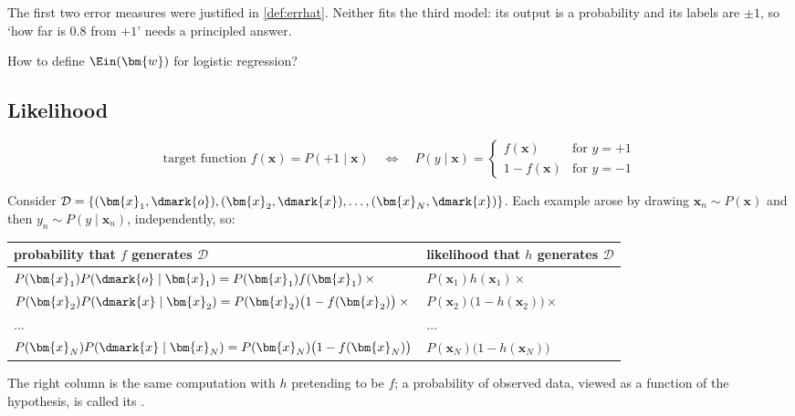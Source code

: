 The first two error measures were justified in \autoref{def:errhat}. Neither
fits the third model: its output is a probability and its labels are
\(\pm 1\), so `how far is \(0.8\) from \(+1\)' needs a principled answer.

\begin{question}
    How to define \(\Ein(\bm{w})\) for logistic regression?
\end{question}

\subsection{Likelihood}

\[
    \text{target function } f(\bm{x}) = P(+1 \mid \bm{x})
    \quad \Longleftrightarrow \quad
    P(y \mid \bm{x}) = \begin{cases}
        f(\bm{x}) & \text{for } y = +1\\
        1 - f(\bm{x}) & \text{for } y = -1
    \end{cases}
\]

Consider \(\mathcal{D} = \left\{ (\bm{x}_1, \dmark{o}), (\bm{x}_2, \dmark{x}),
\dots , (\bm{x}_N, \dmark{x}) \right\}\). Each example arose by drawing
\(\bm{x}_n \sim P(\bm{x})\) and then \(y_n \sim P(y \mid \bm{x}_n)\),
independently, so:

\begin{center}
    \solidrules
    \begin{tabular}{@{}l|l@{}}
        \toprule
        \textbf{probability that \(f\) generates \(\mathcal{D}\)}
        & \textbf{likelihood that \(h\) generates \(\mathcal{D}\)}\\
        \midrule
        \(P(\bm{x}_1) P(\dmark{o} \mid \bm{x}_1) = P(\bm{x}_1) f(\bm{x}_1)
        \times{}\)
        & \(P(\bm{x}_1) h(\bm{x}_1) \times{}\)\\
        \(P(\bm{x}_2) P(\dmark{x} \mid \bm{x}_2) = P(\bm{x}_2) \bigl( 1 -
        f(\bm{x}_2) \bigr) \times{}\)
        & \(P(\bm{x}_2) \bigl( 1 - h(\bm{x}_2) \bigr) \times{}\)\\
        \(\dots\) & \(\dots\)\\
        \(P(\bm{x}_N) P(\dmark{x} \mid \bm{x}_N) = P(\bm{x}_N) \bigl( 1 -
        f(\bm{x}_N) \bigr)\)
        &\(P(\bm{x}_N) \bigl( 1 - h(\bm{x}_N) \bigr)\)\\
        \bottomrule
    \end{tabular}
\end{center}

The right column is the same computation with \(h\) pretending to be \(f\); a
probability of observed data, viewed as a function of the hypothesis, is
called its .

